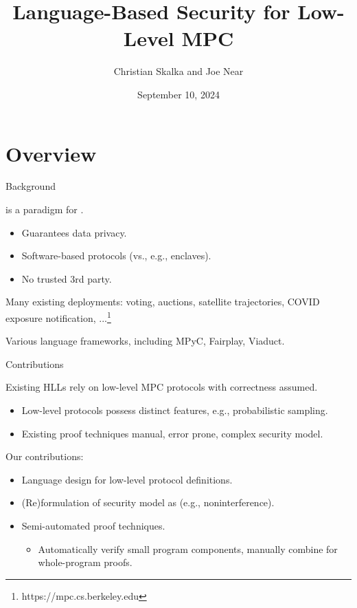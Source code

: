 \documentclass{beamer}
\title{Language-Based Security for Low-Level MPC}
\author{Christian Skalka and Joe Near}
\date{September 10, 2024}
\begin{document}
\begin{frame}
    \titlepage 
\end{frame}

\logo{}



\section{Overview}

\begin{frame}{Background}
  
   is a paradigm for
  .
  \begin{itemize}
  \item Guarantees data privacy.
  \item Software-based protocols (vs., e.g., enclaves).
  \item No trusted 3rd party.
  \end{itemize}
  Many existing deployments: voting, auctions, satellite trajectories, COVID exposure notification, ...\footnote{https://mpc.cs.berkeley.edu}

  \medskip

  Various language frameworks, including MPyC, Fairplay, Viaduct.
\end{frame}

\begin{frame}{Contributions}

  Existing HLLs rely on low-level MPC protocols with correctness
  assumed.
  \begin{itemize}
  \item Low-level protocols possess distinct features, e.g., probabilistic sampling.
  \item Existing proof techniques manual, error prone, complex security model.
  \end{itemize}
  Our contributions:
  \begin{itemize}
  \item Language design for low-level protocol definitions.
  \item (Re)formulation of security model as  (e.g., noninterference).
  \item Semi-automated proof techniques.
    \begin{itemize}
    \item Automatically verify small program components, manually combine for whole-program proofs. 
    \end{itemize}
  \end{itemize}
  
\end{frame}
\end{document}
